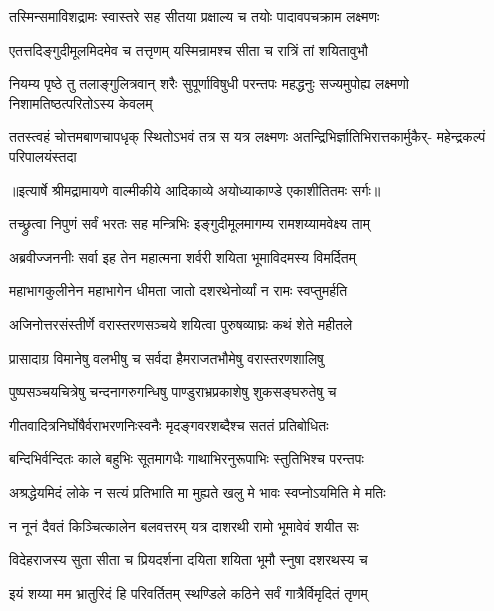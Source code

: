\twolineshloka
{तस्मिन्समाविशद्रामः स्वास्तरे सह सीतया}
{प्रक्षाल्य च तयोः पादावपचक्राम लक्ष्मणः} %

\twolineshloka
{एतत्तदिङ्गुदीमूलमिदमेव च तत्तृणम्}
{यस्मिन्रामश्च सीता च रात्रिं तां शयितावुभौ} %

\fourlineindentedshloka
{नियम्य पृष्ठे तु तलाङ्गुलित्रवान्}
{शरैः सुपूर्णाविषुधी परन्तपः}
{महद्धनुः सज्यमुपोह्य लक्ष्मणो}
{निशामतिष्ठत्परितोऽस्य केवलम्} %

\fourlineindentedshloka
{ततस्त्वहं चोत्तमबाणचापधृक्}
{स्थितोऽभवं तत्र स यत्र लक्ष्मणः}
{अतन्द्रिभिर्ज्ञातिभिरात्तकार्मुकैर्-}
{महेन्द्रकल्पं परिपालयंस्तदा} %


{॥इत्यार्षे श्रीमद्रामायणे वाल्मीकीये आदिकाव्ये अयोध्याकाण्डे एकाशीतितमः सर्गः॥}


\twolineshloka
{तच्छ्रुत्वा निपुणं सर्वं भरतः सह मन्त्रिभिः}
{इङ्गुदीमूलमागम्य रामशय्यामवेक्ष्य ताम्} %

\twolineshloka
{अब्रवीज्जननीः सर्वा इह तेन महात्मना}
{शर्वरी शयिता भूमाविदमस्य विमर्दितम्} %

\twolineshloka
{महाभागकुलीनेन महाभागेन धीमता}
{जातो दशरथेनोर्व्यां न रामः स्वप्तुमर्हति} %

\twolineshloka
{अजिनोत्तरसंस्तीर्णे वरास्तरणसञ्चये}
{शयित्वा पुरुषव्याघ्रः कथं शेते महीतले} %

\twolineshloka
{प्रासादाग्र विमानेषु वलभीषु च सर्वदा}
{हैमराजतभौमेषु वरास्तरणशालिषु} %

\twolineshloka
{पुष्पसञ्चयचित्रेषु चन्दनागरुगन्धिषु}
{पाण्डुराभ्रप्रकाशेषु शुकसङ्घरुतेषु च} %

\twolineshloka
{गीतवादित्रनिर्घोषैर्वराभरणनिःस्वनैः}
{मृदङ्गवरशब्दैश्च सततं प्रतिबोधितः} %

\twolineshloka
{बन्दिभिर्वन्दितः काले बहुभिः सूतमागधैः}
{गाथाभिरनुरूपाभिः स्तुतिभिश्च परन्तपः} %

\twolineshloka
{अश्रद्धेयमिदं लोके न सत्यं प्रतिभाति मा}
{मुह्यते खलु मे भावः स्वप्नोऽयमिति मे मतिः} %

\twolineshloka
{न नूनं दैवतं किञ्चित्कालेन बलवत्तरम्}
{यत्र दाशरथी रामो भूमावेवं शयीत सः} %

\twolineshloka
{विदेहराजस्य सुता सीता च प्रियदर्शना}
{दयिता शयिता भूमौ स्नुषा दशरथस्य च} %

\twolineshloka
{इयं शय्या मम भ्रातुरिदं हि परिवर्तितम्}
{स्थण्डिले कठिने सर्वं गात्रैर्विमृदितं तृणम्} %

